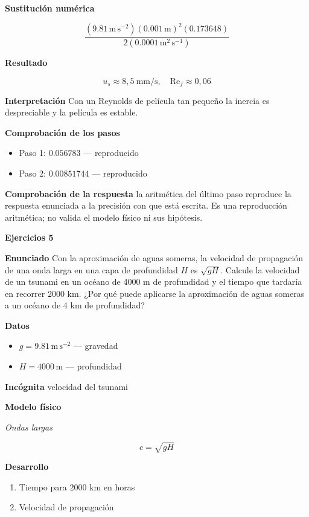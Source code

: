 \documentclass[10pt,openany]{book}
\begin{document}
\noindent\textbf{Sustitución numérica}

\[
\frac{\left(9.81\,\mathrm{m}\,\mathrm{s}^{-2}\right) \left(0.001\,\mathrm{m}\right)^{2} \left(0.173648\right)}{2 \left(0.0001\,\mathrm{m}^{2}\,\mathrm{s}^{-1}\right)}
\]

\noindent\textbf{Resultado}

\[
u_s \approx 8{,}5\ \mathrm{mm/s},\quad \mathrm{Re}_f \approx 0{,}06
\]

\noindent\textbf{Interpretación}
Con un Reynolds de película tan pequeño la inercia es despreciable y la película es estable.

\noindent\textbf{Comprobación de los pasos}
\begin{itemize}
\item Paso 1: $0.056783$ — reproducido
\item Paso 2: $0.00851744$ — reproducido
\end{itemize}

\noindent\textbf{Comprobación de la respuesta} la aritmética del último paso reproduce la respuesta enunciada a la precisión con que está escrita. Es una reproducción aritmética; no valida el modelo físico ni sus hipótesis.

\noindent\textbf{Ejercicios 5}

\noindent\textbf{Enunciado}
Con la aproximación de aguas someras, la velocidad de propagación de una onda larga en una capa de profundidad \(H\) es \(\sqrt{gH}\). Calcule la velocidad de un tsunami en un océano de 4000 m de profundidad y el tiempo que tardaría en recorrer 2000 km. ¿Por qué puede aplicarse la aproximación de aguas someras a un océano de 4 km de profundidad?

\noindent\textbf{Datos}
\begin{itemize}
\item $g = 9.81\,\mathrm{m}\,\mathrm{s}^{-2}$ — gravedad
\item $H = 4000\,\mathrm{m}$ — profundidad
\end{itemize}

\noindent\textbf{Incógnita}
velocidad del tsunami

\noindent\textbf{Modelo físico}

\noindent\textit{Ondas largas}

\[
c = \sqrt{g H}
\]

\noindent\textbf{Desarrollo}
\begin{enumerate}
\item
Tiempo para 2000 km en horas
\item
Velocidad de propagación
\end{enumerate}
\end{document}
